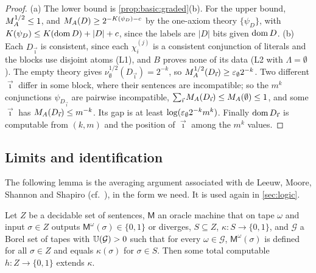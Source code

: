 \begin{proof}
(a) The lower bound is \cref{prop:basic:graded}(b). For the upper bound, $M_{A}^{1/2}\le1$, and $M_{A}(D)\ge2^{-K(\psi_D)-c}$ by the one-axiom theory $\{\psi_D\}$, with $K(\psi_D)\le K(\operatorname{dom} D)+\lvert D\rvert+c$, since the labels are $\lvert D\rvert$ bits given $\operatorname{dom} D$.
(b) Each $D_{\vec\imath}$ is consistent, since each $\chi^{(j)}_i$ is a consistent conjunction of literals and the blocks use disjoint atoms (L1), and $B$ proves none of its data (L2 with $\Lambda=\emptyset$). The empty theory gives $\nu^{1/2}_\emptyset(D_{\vec\imath})=2^{-k}$, so $M_{A}^{1/2}(D_{\vec\imath})\ge\varepsilon_{\emptyset}2^{-k}$. Two different $\vec\imath$ differ in some block, where their sentences are incompatible; so the $m^k$ conjunctions $\psi_{D_{\vec\imath}}$ are pairwise incompatible, $\sum_{\vec\imath}M_{A}(D_{\vec\imath})\le M_{A}(\emptyset)\le1$, and some $\vec\imath$ has $M_{A}(D_{\vec\imath})\le m^{-k}$. Its gap is at least $\log(\varepsilon_{\emptyset}2^{-k}m^k)$. Finally $\operatorname{dom} D_{\vec\imath}$ is computable from $(k,m)$ and the position of $\vec\imath$ among the $m^k$ values.
\end{proof}

\subsection{Limits and identification}\label{app:basic:limits}

The following lemma is the averaging argument associated with de Leeuw, Moore, Shannon and Shapiro (cf.\ \citealp{deleeuw1956computability}), in the form we need. It is used again in \cref{sec:logic}.

\begin{lemma}\label{lem:basic:majority}
Let $Z$ be a decidable set of sentences, $\mathsf M$ an oracle machine that on tape $\omega$ and input $\sigma\in Z$ outputs $\mathsf M^\omega(\sigma)\in\{0,1\}$ or diverges, $S\subseteq Z$, $\kappa:S\to\{0,1\}$, and $\mathcal G$ a Borel set of tapes with $\mathbb{U}(\mathcal G)>0$ such that for every $\omega\in\mathcal G$, $\mathsf M^\omega(\sigma)$ is defined for all $\sigma\in Z$ and equals $\kappa(\sigma)$ for $\sigma\in S$. Then some total computable $h:Z\to\{0,1\}$ extends $\kappa$.
\end{lemma}

